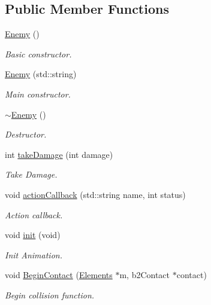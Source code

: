 \subsection*{Public Member Functions}
\begin{DoxyCompactItemize}
\item 
\hyperlink{class_enemy_a94f30d348b6d2840fd71675472ba38dd}{Enemy} ()
\begin{DoxyCompactList}\small\item\em Basic constructor. \end{DoxyCompactList}\item 
\hyperlink{class_enemy_a258ddb71f2f298663dc1ff988dcfd2e2}{Enemy} (std\-::string)
\begin{DoxyCompactList}\small\item\em Main constructor. \end{DoxyCompactList}\item 
\hyperlink{class_enemy_ac0eec4755e28c02688065f9657150ac3}{$\sim$\-Enemy} ()
\begin{DoxyCompactList}\small\item\em Destructor. \end{DoxyCompactList}\item 
int \hyperlink{class_enemy_ae4335909ac929e5e5db7eb01b15fbce8}{take\-Damage} (int damage)
\begin{DoxyCompactList}\small\item\em Take Damage. \end{DoxyCompactList}\item 
void \hyperlink{class_enemy_a2f1157b7c8d74371c2b06493563423ee}{action\-Callback} (std\-::string name, int status)
\begin{DoxyCompactList}\small\item\em Action callback. \end{DoxyCompactList}\item 
void \hyperlink{class_enemy_a4ed496f92f8c791133494d24b4eeaff6}{init} (void)
\begin{DoxyCompactList}\small\item\em Init Animation. \end{DoxyCompactList}\item 
void \hyperlink{class_enemy_a3938e3e2cf5f07d809e1f1927b09539a}{Begin\-Contact} (\hyperlink{class_elements}{Elements} $\ast$m, b2\-Contact $\ast$contact)
\begin{DoxyCompactList}\small\item\em Begin collision function. \end{DoxyCompactList}\end{DoxyCompactItemize}
